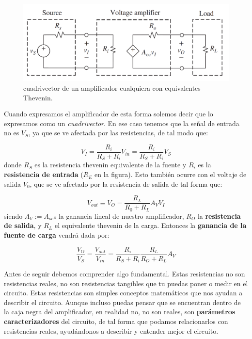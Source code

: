 \documentclass[11pt]{article} %
\begin{document}
\begin{figure}[h!] \centering
\includegraphics[scale=0.35]{1.1-Cuadrivector.png}
\caption{cuadrivector de un amplificador cualquiera con equivalentes Thevenin.}
\label{Fig:1.1-Cuadrivector}
\end{figure}

Cuando expresamos el amplificador de esta forma solemos decir que lo expresamos como un \textit{cuadrivector}. En ese caso tenemos que la señal de entrada no es $V_S$, ya que se ve afectada por las resistencias, de tal modo que:

\begin{equation}
 V_I = \dfrac{R_i}{R_S + R_i} V_{in}= \dfrac{R_i}{R_S + R_i} V_{S}
\end{equation}
donde $R_S$ es la resistencia thevenin equivalente de la fuente y $R_i$ es la \textbf{resistencia de entrada} ($R_E$ en la figura). Esto también ocurre con el voltaje de salida $V_0$, que se ve afectado por la resistencia de salida de tal forma que:

\begin{equation}
V_{out} \equiv V_O = \dfrac{R_L}{R_0 + R_L} A_V V_I
\end{equation}
siendo $A_V := A_{oc}$s la ganancia lineal de nuestro amplificador, $R_O$ la \textbf{resistencia de salida}, y $R_L$ el equivalente thevenin de la carga. Entonces la \textbf{ganancia de la fuente de carga} vendrá dada por:

\begin{equation}
\dfrac{V_O}{V_S} = \dfrac{V_{out}}{V_{in}} = \dfrac{R_{i}}{R_S + R_i} \dfrac{R_L}{R_O + R_L} A_V
\end{equation}

Antes de seguir debemos comprender algo fundamental. Estas resistencias no son resistencias reales, no son resistencias tangibles que tu puedas poner o medir en el circuito. Estas resistencias son simples conceptos matemáticos que nos ayudan a describir el circuito. Aunque incluso puedas pensar que se encuentran dentro de la caja negra del amplificador, en realidad no, no son reales, son \textbf{parámetros caracterizadores} del circuito, de tal forma que podamos relacionarlos con resistencias reales, ayudándonos a describir y entender mejor el circuito. \\
\end{document}
